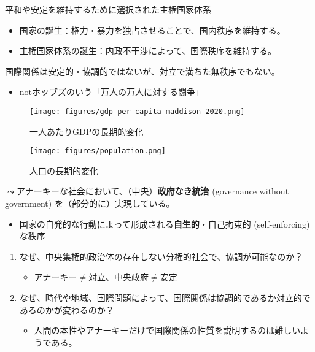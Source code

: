 \documentclass[
  xelatex,
  ja=standard]{bxjsarticle}
\providecommand{\tightlist}{%
  \setlength{\itemsep}{0pt}\setlength{\parskip}{0pt}}\usepackage{longtable,booktabs,array}
\begin{document}
平和や安定を維持するために選択された主権国家体系

\begin{itemize}
\tightlist
\item
  国家の誕生：権力・暴力を独占させることで、国内秩序を維持する。
\item
  主権国家体系の誕生：内政不干渉によって、国際秩序を維持する。
\end{itemize}

国際関係は安定的・協調的ではないが、対立で満ちた無秩序でもない。

\begin{itemize}
\tightlist
\item
  notホッブズのいう「万人の万人に対する闘争」
\end{itemize}

\begin{figure}[htpb]

{\centering \texttt{[image: figures/gdp-per-capita-maddison-2020.png]}

}

\caption{一人あたりGDPの長期的変化}

\end{figure}

\begin{figure}[htpb]

{\centering \texttt{[image: figures/population.png]}

}

\caption{人口の長期的変化}

\end{figure}

\(\leadsto\)アナーキーな社会において、（中央）\textbf{政府なき統治}
(governance without government) を（部分的に）実現している。

\begin{itemize}
\tightlist
\item
  国家の自発的な行動によって形成される\textbf{自生的}・自己拘束的
  (self-enforcing) な秩序
\end{itemize}

\begin{enumerate}
\def\labelenumi{\arabic{enumi}.}
\tightlist
\item
  なぜ、中央集権的政治体の存在しない分権的社会で、協調が可能なのか？

  \begin{itemize}
  \tightlist
  \item
    アナーキー\(\neq\)対立、中央政府\(\neq\)安定
  \end{itemize}
\item
  なぜ、時代や地域、国際問題によって、国際関係は協調的であるか対立的であるのかが変わるのか？

  \begin{itemize}
  \tightlist
  \item
    人間の本性やアナーキーだけで国際関係の性質を説明するのは難しいようである。
  \end{itemize}
\end{enumerate}
\end{document}

